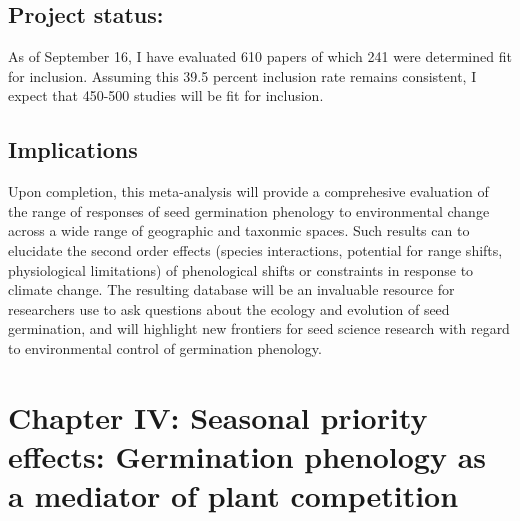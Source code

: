 \documentclass{article}\usepackage[]{graphicx}\usepackage[]{color}
\begin{document}
\subsection*{Project status:}
As of September 16, I have evaluated 610 papers of which 241 were determined fit for inclusion. Assuming this 39.5 percent inclusion rate remains consistent, I expect that 450-500 studies will be fit for inclusion.
\subsection*{Implications}
\indent\indent Upon completion, this meta-analysis will provide a comprehesive evaluation of the range of responses of seed germination phenology to environmental change across a wide range of geographic and taxonmic spaces. Such results can to elucidate the second order effects (species interactions, potential for range shifts, physiological limitations) of phenological shifts or constraints in response to climate change. The resulting database will be an invaluable resource for researchers use to ask questions about the ecology and evolution of seed germination, and will highlight new frontiers for seed science research with regard to environmental control of germination phenology.

\section*{Chapter IV: Seasonal priority effects: Germination phenology as a mediator of plant competition}
\end{document}
